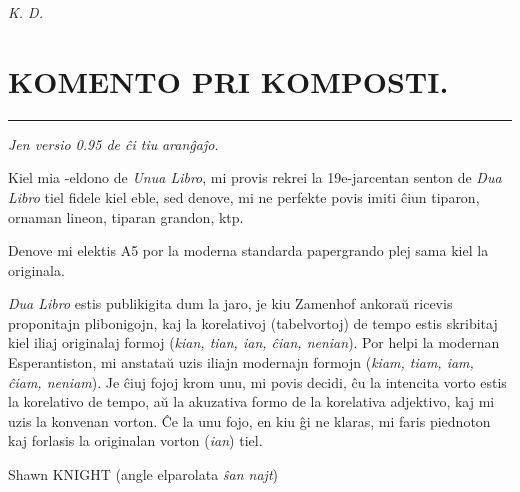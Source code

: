 \documentclass[ngerman,12pt,twoside]{book}
\newcommand{\laversio}{0.95}
\begin{document}
\begin{flushright}
\it K. D. 
\end{flushright}

\begin{center}
\end{center}
\titlespacing*{\chapter}{0pt}{0pt}{0pt}
%
%
\fancyhead[C]{--- \thepage ---}
\titleformat{\chapter}[display]{\centering\sansfont}{\chaptertitlename}{0pt}{\large}
\chapter*{KOMENTO PRI KOMPOSTI.}

\begin{center}
\rule[0.5ex]{0.5\textwidth}{0.4pt}

\emph{Jen versio \laversio{} de ĉi tiu} \XeLaTeX{} \emph{aranĝaĵo.}
\end{center}

\small Kiel mia \XeLaTeX{}-eldono de \emph{Unua Libro}, mi provis rekrei la 19e-jarcentan \glqq{}senton\grqq{} de \emph{Dua Libro} tiel fidele kiel eble, sed denove, mi ne perfekte povis imiti ĉiun tiparon, ornaman lineon, tiparan grandon, ktp.

Denove mi elektis A5 por la moderna standarda papergrando plej sama kiel la originala.

\emph{Dua Libro} estis publikigita dum la jaro, je kiu Zamenhof ankoraŭ ricevis proponitajn plibonigojn, kaj la korelativoj (tabelvortoj) de tempo estis skribitaj kiel iliaj originalaj formoj (\emph{kian, tian, ian, ĉian, nenian}). Por helpi la modernan Esperantiston, mi anstataŭ uzis iliajn modernajn formojn (\emph{kiam, tiam, iam, ĉiam, neniam}).  Je ĉiuj fojoj krom unu, mi povis decidi, ĉu la intencita vorto estis la korelativo de tempo, aŭ la akuzativa formo de la korelativa adjektivo, kaj mi uzis la konvenan vorton.  Ĉe la unu fojo, en kiu ĝi ne klaras, mi faris piednoton kaj forlasis la originalan vorton (\emph{ian}) tiel. 

\vspace{1ex}

{\setlength{\parindent}{0em}
Shawn KNIGHT (angle elparolata \emph{ŝan najt})\\
\hodiau}
\end{document}
